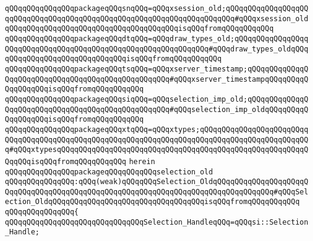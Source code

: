 \verb|qQQqqQQqqQQqqQQqpackageqQQqsnqQQq=qQQqxsession_old;qQQqqQQqqQQqqQQqqQQqqQQqqQQqqQQqqQQqqQQqqQQqqQQqqQQqqQQqqQQqqQQqqQQqqQQq#qQQqxsession_oldqQQqqQQqqQQqqQQqqQQqqQQqqQQqqQQqqQQqqQQqisqQQqfromqQQqqQQqqQQq|\newline
\verb|qQQqqQQqqQQqqQQqpackageqQQqdtqQQq=qQQqdraw_types_old;qQQqqQQqqQQqqQQqqQQqqQQqqQQqqQQqqQQqqQQqqQQqqQQqqQQqqQQqqQQqqQQq#qQQqdraw_types_oldqQQqqQQqqQQqqQQqqQQqqQQqqQQqqQQqisqQQqfromqQQqqQQqqQQq|\newline
\verb|qQQqqQQqqQQqqQQqpackageqQQqtsqQQq=qQQqxserver_timestamp;qQQqqQQqqQQqqQQqqQQqqQQqqQQqqQQqqQQqqQQqqQQqqQQqqQQq#qQQqxserver_timestampqQQqqQQqqQQqqQQqqQQqisqQQqfromqQQqqQQqqQQq|\newline
\verb|qQQqqQQqqQQqqQQqpackageqQQqsiqQQq=qQQqselection_imp_old;qQQqqQQqqQQqqQQqqQQqqQQqqQQqqQQqqQQqqQQqqQQqqQQqqQQq#qQQqselection_imp_oldqQQqqQQqqQQqqQQqqQQqisqQQqfromqQQqqQQqqQQq|\newline
\verb|qQQqqQQqqQQqqQQqpackageqQQqxtqQQq=qQQqxtypes;qQQqqQQqqQQqqQQqqQQqqQQqqQQqqQQqqQQqqQQqqQQqqQQqqQQqqQQqqQQqqQQqqQQqqQQqqQQqqQQqqQQqqQQqqQQqqQQq#qQQqxtypesqQQqqQQqqQQqqQQqqQQqqQQqqQQqqQQqqQQqqQQqqQQqqQQqqQQqqQQqqQQqqQQqisqQQqfromqQQqqQQqqQQq|\newline
\verb|herein|\newline
\newline
\newline
\verb|qQQqqQQqqQQqqQQqpackageqQQqqQQqqQQqselection_old|\newline
\verb|qQQqqQQqqQQqqQQq:qQQq(weak)qQQqqQQqSelection_OldqQQqqQQqqQQqqQQqqQQqqQQqqQQqqQQqqQQqqQQqqQQqqQQqqQQqqQQqqQQqqQQqqQQqqQQqqQQqqQQqqQQq#qQQqSelection_OldqQQqqQQqqQQqqQQqqQQqqQQqqQQqqQQqqQQqisqQQqfromqQQqqQQqqQQq|\newline
\verb|qQQqqQQqqQQqqQQq{|\newline
\verb|qQQqqQQqqQQqqQQqqQQqqQQqqQQqqQQqSelection_HandleqQQq=qQQqsi::Selection_Handle;|\newline
